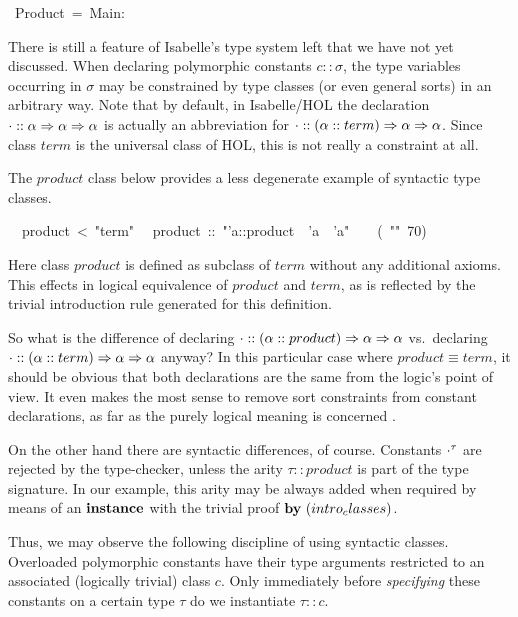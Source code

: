 \begin{isabelle}%
%
\ Product\ =\ Main:%
\begin{isamarkuptext}%
\medskip\noindent There is still a feature of Isabelle's type system
 left that we have not yet discussed.  When declaring polymorphic
 constants $c :: \sigma$, the type variables occurring in $\sigma$ may
 be constrained by type classes (or even general sorts) in an
 arbitrary way.  Note that by default, in Isabelle/HOL the declaration
 $\cdot :: \alpha \Rightarrow \alpha \Rightarrow \alpha$ is actually an abbreviation
 for $\cdot :: (\alpha::term) \Rightarrow \alpha \Rightarrow \alpha$.  Since class
 $term$ is the universal class of HOL, this is not really a constraint
 at all.

 The $product$ class below provides a less degenerate example of
 syntactic type classes.%
\end{isamarkuptext}%
\isanewline
\ \ product\ <\ {"}term{"}\isanewline
{}\isanewline
\ \ product\ ::\ {"}'a::product\ {\isasymRightarrow}\ 'a\ {\isasymRightarrow}\ 'a{"}\ \ \ \ (\ {"}{\isasymOtimes}{"}\ 70)%
\begin{isamarkuptext}%
Here class $product$ is defined as subclass of $term$ without any
 additional axioms.  This effects in logical equivalence of $product$
 and $term$, as is reflected by the trivial introduction rule
 generated for this definition.

 \medskip So what is the difference of declaring $\cdot :: (\alpha ::
 product) \Rightarrow \alpha \Rightarrow \alpha$ vs.\ declaring $\cdot :: (\alpha ::
 term) \Rightarrow \alpha \Rightarrow \alpha$ anyway?  In this particular case where
 $product \equiv term$, it should be obvious that both declarations
 are the same from the logic's point of view.  It even makes the most
 sense to remove sort constraints from constant declarations, as far
 as the purely logical meaning is concerned \cite{Wenzel:1997:TPHOL}.

 On the other hand there are syntactic differences, of course.
 Constants $\cdot^\tau$ are rejected by the type-checker, unless the
 arity $\tau :: product$ is part of the type signature.  In our
 example, this arity may be always added when required by means of an
 ${\mathord{\mathbf{instance}}}$ with the trivial proof $\BY{intro_classes}$.

 \medskip Thus, we may observe the following discipline of using
 syntactic classes.  Overloaded polymorphic constants have their type
 arguments restricted to an associated (logically trivial) class $c$.
 Only immediately before \emph{specifying} these constants on a
 certain type $\tau$ do we instantiate $\tau :: c$.


\end{isamarkuptext}
\end{isabelle}
